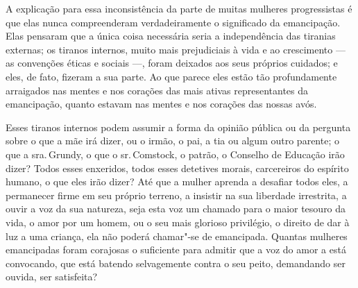A explicação para essa inconsistência da parte de muitas mulheres
progressistas é que elas nunca compreenderam verdadeiramente o
significado da emancipação. Elas pensaram que a única coisa necessária
seria a independência das tiranias externas; os tiranos internos, muito
mais prejudiciais à vida e ao crescimento --- as convenções éticas e
sociais ---, foram deixados aos seus próprios cuidados; e eles, de fato,
fizeram a sua parte. Ao que parece eles estão tão profundamente
arraigados nas mentes e nos corações das mais ativas representantes da
emancipação, quanto estavam nas mentes e nos corações das nossas avós.

Esses tiranos internos podem assumir a forma da opinião pública ou da
pergunta sobre o que a mãe irá dizer, ou o irmão, o pai, a tia ou algum
outro parente; o que a sra.\,Grundy, o que o sr.\,Comstock, o patrão, o
Conselho de Educação irão dizer? Todos esses enxeridos, todos esses
detetives morais, carcereiros do espírito humano, o que eles irão dizer?
Até que a mulher aprenda a desafiar todos eles, a permanecer firme em
seu próprio terreno, a insistir na sua liberdade irrestrita, a ouvir a
voz da sua natureza, seja esta voz um chamado para o maior tesouro da
vida, o amor por um homem, ou o seu mais glorioso privilégio, o direito
de dar à luz a uma criança, ela não poderá chamar"-se de emancipada.
Quantas mulheres emancipadas foram corajosas o suficiente para admitir
que a voz do amor a está convocando, que está batendo selvagemente
contra o seu peito, demandando ser ouvida, ser satisfeita?

